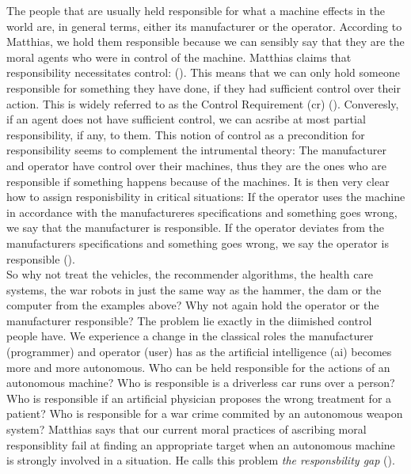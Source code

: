 \documentclass{article}
\newcounter{example}
\begin{document}
The people that are usually held responsible for what a machine effects in the
world are, in general terms, either its manufacturer or the operator. According
to Matthias, we hold them responsible because we can sensibly say that they are
the moral agents who were in control of the machine. Matthias claims that
responsibility necessitates control:  (\cite[p.175]{Matthias_2004}).
This means that we can only hold someone responsible for something they have
done, if they had sufficient control over their action.
This is widely referred to as the Control Requirement (\acrshort{cr}) (\cite[p.
49]{marino2006learning}). Converesly, if an agent does not have sufficient
control, we can acsribe at most partial responsibility, if any, to them. This
notion of control as a precondition for responsibility seems to complement the
intrumental theory: The manufacturer and operator have control over their
machines, thus they are the ones who are responsible if something happens
because of the machines. It is then very clear how to assign responisbility in
critical situations: If the operator uses the machine in accordance with the
manufactureres specifications and something goes wrong, we say that the
manufacturer is responsible. If the operator deviates from the manufacturers
specifications and something goes wrong, we say the operator is responsible
(\cite[p.175]{Matthias_2004}).\\

So why not treat the vehicles, the recommender algorithms, the health care
systems, the war robots in just the same way as the hammer, the dam or the
computer from the examples above? Why not again hold the operator or the
manufacturer responsible? The problem lie exactly in the diimished control
people have. We experience a change in the classical roles the manufacturer
(programmer) and operator (user) has as the artificial intelligence
(\acrshort{ai}) becomes more and more autonomous. Who can be held responsible
for the actions of an autonomous machine? Who is responsible is a driverless car
runs over a person? Who is responsible if an artificial physician proposes the
wrong treatment for a patient? Who is responsible for a war crime commited by an
autonomous weapon system? Matthias says that our current moral practices of
ascribing moral responsiblity fail at finding an appropriate target when an
autonomous machine is strongly involved in a situation. He calls this problem
\textit{the responsbility gap} (\cite[p. 181]{Matthias_2004}).\\
\end{document}
